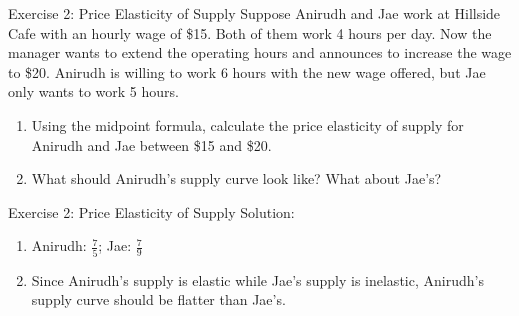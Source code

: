 \documentclass[9pt, handout]{beamer}
\begin{document}
\begin{frame}{Exercise 2: Price Elasticity of Supply}
    Suppose Anirudh and Jae work at Hillside Cafe with an hourly wage of \$15. Both of them work 4 hours per day. Now the manager wants to extend the operating hours and announces to increase the wage to \$20. Anirudh is willing to work 6 hours with the new wage offered, but Jae only wants to work 5 hours. 
    \begin{enumerate}
        \item Using the midpoint formula, calculate the price elasticity of supply for Anirudh and Jae between \$15 and \$20.  
        \item What should Anirudh's supply curve look like? What about Jae's?  
    \end{enumerate}
    \vspace{1.5in}
\end{frame}

\begin{frame}{Exercise 2: Price Elasticity of Supply}
    Solution: 
    \begin{enumerate}
        \item Anirudh: $\frac{7}{5}$; Jae: $\frac{7}{9}$
        \item Since Anirudh's supply is elastic while Jae's supply is inelastic, Anirudh's supply curve should be flatter than Jae's. 
    \end{enumerate}
\end{frame}
\end{document}

